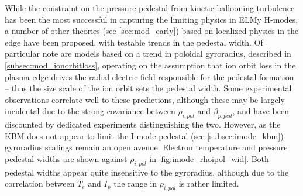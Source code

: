 \begin{figure}[p]
 \pushtooutside
\end{figure}

\begin{figure}[p]
 \pushtooutside
\end{figure}

While the constraint on the pressure pedestal from kinetic-ballooning turbulence has been the most successful in capturing the limiting physics in ELMy H-modes, a number of other theories (see \cref{sec:mod_early}) based on localized physics in the edge have been proposed, with testable trends in the pedestal width.  Of particular note are models based on a trend in poloidal gyroradius, described in \cref{subsec:mod_ionorbitloss}, operating on the assumption that ion orbit loss in the plasma edge drives the radial electric field responsible for the pedestal formation -- thus the size scale of the ion orbit sets the pedestal width.  Some experimental observations correlate well to these predictions, although these may be largely incidental due to the strong covariance between $\rho_{i,pol}$ and $\beta_{p,ped}$, and have been discounted by dedicated experiments distinguishing the two.  However, as the KBM does not appear to limit the I-mode pedestal (see \cref{subsec:imode_kbm}) gyroradius scalings remain an open avenue.  Electron temperature and pressure pedestal widths are shown against $\rho_{i,pol}$ in \cref{fig:imode_rhoipol_wid}.  Both pedestal widths appear quite insensitive to the gyroradius, although due to the correlation between $T_e$ and $I_p$ the range in $\rho_{i,pol}$ is rather limited.

